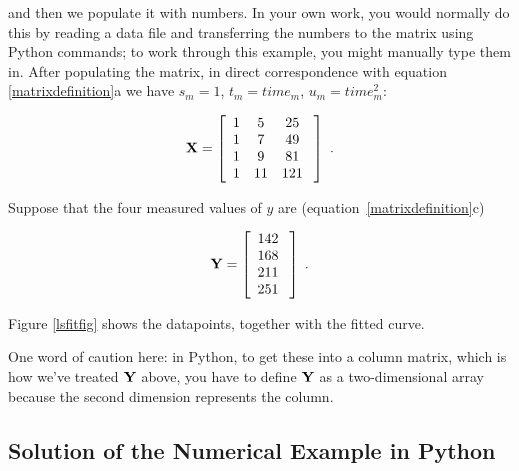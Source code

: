\documentclass[psfig,preprint]{aastex}
\begin{document}
\noindent and then we populate it with numbers.  In your own work, you
would normally do this by reading a data file and transferring the
numbers to the matrix using Python commands; to work through this example,
you might manually type them in.  After populating the matrix, in direct
correspondence with equation \ref{matrixdefinition}a we have $s_m = 1$,
$t_m = time_m$, $u_m = time_m^2$:

\begin{mathletters}
\begin{eqnarray}
{\bf X} = \left[
\begin{array}{ccc}
1  &  5   &  25  \\
1  &  7   &  49  \\
1  &  9   &  81  \\
1  &  11  &  121 \\
\end{array} \; \right] \ .
\end{eqnarray}
\end{mathletters}

\noindent Suppose that the four measured values of $y$ are
(equation~\ref{matrixdefinition}c)

\begin{mathletters}
\begin{eqnarray}
{\bf Y} = \left[
\begin{array}{c}
142 \\
168 \\
211 \\
251 \\
\end{array} \; \right] \; .
\end{eqnarray}
\end{mathletters}

\noindent Figure \ref{lsfitfig} shows the datapoints, together with the
fitted curve.

	One word of caution here: in Python, to get these into a column
matrix, which is how we've treated $\bf Y$ above, you have to define
${\bf Y}$ as a two-dimensional array because the second dimension
represents the column. 


	
\subsection{Solution of the Numerical Example in Python} \label{idlsolution}
\end{document}
